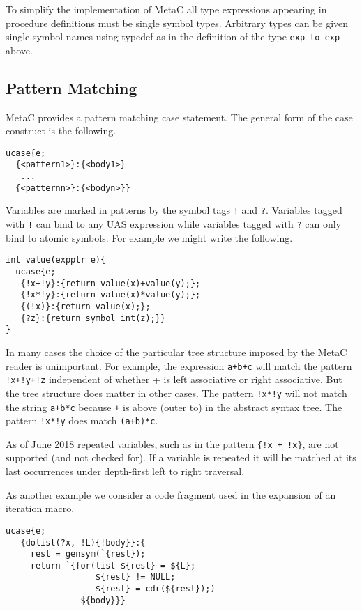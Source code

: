 \documentclass{article}
\begin{document}
To simplify the implementation of MetaC all type expressions appearing in procedure definitions must be single symbol types. Arbitrary types can be given single symbol names
using typedef as in the definition of the type {\tt exp\_to\_exp} above.

\subsection{Pattern Matching}

MetaC provides a pattern matching case statement.
The general form of the case construct is the following.

\begin{verbatim}
ucase{e;
  {<pattern1>}:{<body1>}
   ...
  {<patternn>}:{<bodyn>}}
\end{verbatim}

Variables are marked in patterns by the symbol tags {\tt !} and {\tt ?}.  Variables tagged with {\tt !} can bind to any UAS expression
while variables tagged with {\tt ?} can only bind to atomic symbols.
For example we might write the following.

\begin{verbatim}
int value(expptr e){
  ucase{e;
   {!x+!y}:{return value(x)+value(y);};
   {!x*!y}:{return value(x)*value(y);};
   {(!x)}:{return value(x);};
   {?z}:{return symbol_int(z);}}
}
\end{verbatim}

In many cases the choice of the particular tree structure imposed by the MetaC reader is unimportant.  For example, the expression {\tt a+b+c} will match the pattern
{\tt !x+!y+!z} independent of whether + is left associative or right associative.  But the tree structure does matter in other cases.  The pattern {\tt !x*!y}
will not match the string {\tt a+b*c} because {\tt +} is above (outer to) {\tt *} in the abstract syntax tree. The pattern {\tt !x*!y} does match {\tt (a+b)*c}.

As of June 2018 repeated variables, such as in the pattern {\tt \{!x + !x\}}, are not supported (and not checked for).
If a variable is repeated it will be matched at its last occurrences under depth-first left to right traversal.

As another example we consider a code fragment used in the expansion of an iteration macro.

\begin{verbatim}
ucase{e;
   {dolist(?x, !L){!body}}:{
     rest = gensym(`{rest});
     return `{for(list ${rest} = ${L};
                  ${rest} != NULL;
                  ${rest} = cdr(${rest});)
               ${body}}}
\end{verbatim}
\end{document}
